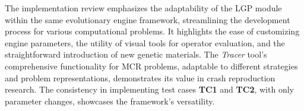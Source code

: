         The implementation review emphasizes the adaptability of the LGP module within the same evolutionary engine 
        framework, streamlining the development process for various computational problems. It highlights the ease of 
        customizing engine parameters, the utility of visual tools for operator evaluation, and the straightforward 
        introduction of new genetic materials. The \textit{Tracer} tool's comprehensive functionality for MCR problems, 
        adaptable to different strategies and problem representations, demonstrates its value in crash reproduction 
        research. The consistency in implementing test cases \textbf{TC1} and \textbf{TC2}, with only parameter 
        changes, showcases the framework's versatility.